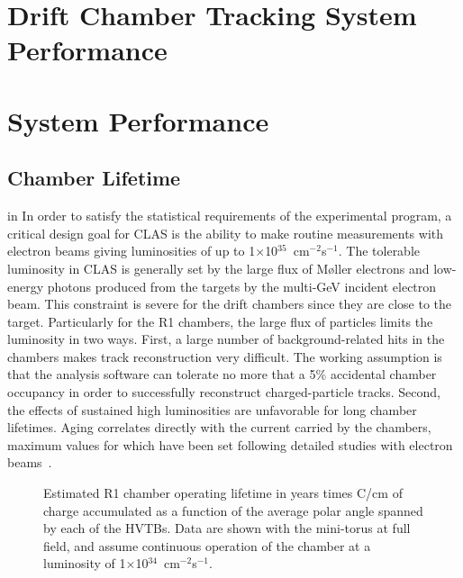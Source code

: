 \section{Drift Chamber Tracking System Performance}

\section{System Performance}

\subsection{Chamber Lifetime}
\label{choper}

 in 
In order to satisfy the statistical requirements of the experimental program, 
a critical design goal for CLAS is the ability to make routine measurements 
with electron beams giving luminosities of up to 
1$\times$10$^{35}$~cm$^{-2}$s$^{-1}$.  The tolerable luminosity in CLAS is 
generally set by the large flux of M{\o}ller electrons and low-energy photons 
produced from the targets by the multi-GeV incident electron beam.  This 
constraint is severe for the drift chambers since they are close to the 
target. Particularly for the R1 chambers, the large flux of 
particles limits the luminosity in two ways.  First, a large number of 
background-related hits in the chambers makes track reconstruction very 
difficult.  The working assumption is that the analysis software can tolerate 
no more that a 5$\%$ accidental chamber occupancy in order to successfully 
reconstruct charged-particle tracks.  Second, the effects of sustained high 
luminosities are unfavorable for long chamber lifetimes.  Aging correlates 
directly with the current carried by the chambers, maximum values for which 
have been set following detailed studies with electron beams~\cite{carman}.

\begin{figure}[htpb]
\vspace{5.0 cm} 
\caption{\small{Estimated R1 chamber operating lifetime in years times C/cm of
charge accumulated as a function of the average polar angle spanned by
each of the HVTBs.  Data are shown with the mini-torus at full field, and
assume continuous operation of the chamber at a luminosity of
1$\times$10$^{34}$~cm$^{-2}$s$^{-1}$.}}
\label{life}
\end{figure}

